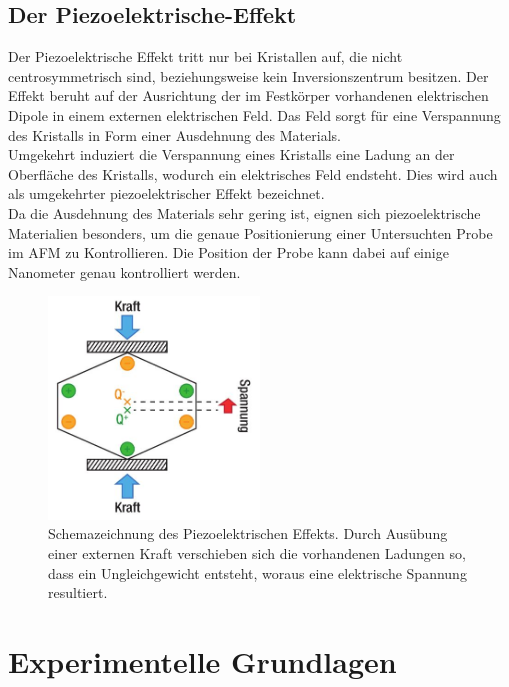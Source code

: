 \subsection{Der Piezoelektrische-Effekt}
Der Piezoelektrische Effekt tritt nur bei Kristallen auf, die nicht centrosymmetrisch sind, beziehungsweise kein Inversionszentrum besitzen. Der Effekt beruht auf der Ausrichtung der im Festkörper vorhandenen elektrischen Dipole in einem externen elektrischen Feld. Das Feld sorgt für eine Verspannung des Kristalls in Form einer Ausdehnung des Materials.\\
Umgekehrt induziert die Verspannung eines Kristalls eine Ladung an der Oberfläche des Kristalls, wodurch ein elektrisches Feld endsteht. Dies wird auch als umgekehrter piezoelektrischer Effekt bezeichnet.\\
Da die Ausdehnung des Materials sehr gering ist, eignen sich piezoelektrische Materialien besonders, um die genaue Positionierung einer Untersuchten Probe im AFM zu Kontrollieren. Die Position der Probe kann dabei auf einige Nanometer genau kontrolliert werden.
\begin{figure}
  \centering
  \includegraphics[width=0.5\textwidth]{content/plots/Piezo.jpg}
  \caption{Schemazeichnung des Piezoelektrischen Effekts. Durch Ausübung einer externen Kraft verschieben sich die vorhandenen Ladungen so, dass ein Ungleichgewicht entsteht, woraus eine elektrische Spannung resultiert.\cite{Thorlabs}}
  \label{fig:piezo}
\end{figure}
%
\section{Experimentelle Grundlagen}
